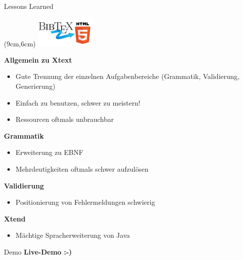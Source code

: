 \documentclass[fleqn,11pt,aspectratio=43]{beamer}
\begin{document}
\begin{frame}{Lessons Learned}
\begin{textblock*}{3cm}(9cm,6cm) %
\includegraphics[width=3cm]{../logo.png}
\end{textblock*}
\textbf{Allgemein zu Xtext}
\begin{itemize}
\item Gute Trennung der einzelnen Aufgabenbereiche (Grammatik, Validierung, Generierung)
\item Einfach zu benutzen, schwer zu meistern!
\item Ressourcen oftmals unbrauchbar
\end{itemize}

\textbf{Grammatik}
\begin{itemize}
\item Erweiterung zu EBNF
\item Mehrdeutigkeiten oftmals schwer aufzulösen
\end{itemize}

\textbf{Validierung}
\begin{itemize}
\item Positionierung von Fehlermeldungen schwierig
\end{itemize}

\textbf{Xtend}
\begin{itemize}
\item Mächtige Spracherweiterung von Java
\end{itemize}

\end{frame}

\begin{frame}{Demo}
\centering
\Huge
\textbf{Live-Demo :-)}
\end{frame}
\end{document}
